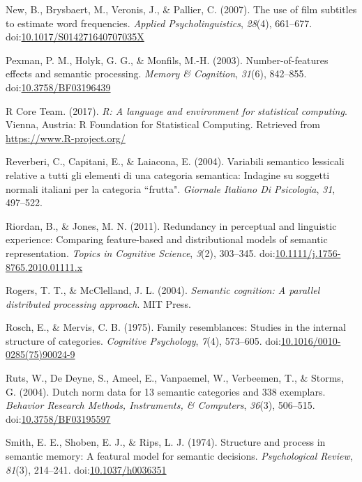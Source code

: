 \documentclass[english,,man]{apa6}
\theoremstyle{definition}
\theoremstyle{definition}
\theoremstyle{definition}
\theoremstyle{remark}
\begin{document}
\leavevmode\hypertarget{ref-New2007}{}%
New, B., Brysbaert, M., Veronis, J., \& Pallier, C. (2007). The use of
film subtitles to estimate word frequencies. \emph{Applied
Psycholinguistics}, \emph{28}(4), 661--677.
doi:\href{https://doi.org/10.1017/S014271640707035X}{10.1017/S014271640707035X}

\leavevmode\hypertarget{ref-Pexman2003}{}%
Pexman, P. M., Holyk, G. G., \& Monfils, M.-H. (2003).
Number-of-features effects and semantic processing. \emph{Memory \&
Cognition}, \emph{31}(6), 842--855.
doi:\href{https://doi.org/10.3758/BF03196439}{10.3758/BF03196439}

\leavevmode\hypertarget{ref-R-base}{}%
R Core Team. (2017). \emph{R: A language and environment for statistical
computing}. Vienna, Austria: R Foundation for Statistical Computing.
Retrieved from \url{https://www.R-project.org/}

\leavevmode\hypertarget{ref-Reverberi2004}{}%
Reverberi, C., Capitani, E., \& Laiacona, E. (2004). Variabili semantico
lessicali relative a tutti gli elementi di una categoria semantica:
Indagine su soggetti normali italiani per la categoria ``frutta".
\emph{Giornale Italiano Di Psicologia}, \emph{31}, 497--522.

\leavevmode\hypertarget{ref-Riordan2011}{}%
Riordan, B., \& Jones, M. N. (2011). Redundancy in perceptual and
linguistic experience: Comparing feature-based and distributional models
of semantic representation. \emph{Topics in Cognitive Science},
\emph{3}(2), 303--345.
doi:\href{https://doi.org/10.1111/j.1756-8765.2010.01111.x}{10.1111/j.1756-8765.2010.01111.x}

\leavevmode\hypertarget{ref-Rogers2004}{}%
Rogers, T. T., \& McClelland, J. L. (2004). \emph{Semantic cognition: A
parallel distributed processing approach}. MIT Press.

\leavevmode\hypertarget{ref-Rosch1975}{}%
Rosch, E., \& Mervis, C. B. (1975). Family resemblances: Studies in the
internal structure of categories. \emph{Cognitive Psychology},
\emph{7}(4), 573--605.
doi:\href{https://doi.org/10.1016/0010-0285(75)90024-9}{10.1016/0010-0285(75)90024-9}

\leavevmode\hypertarget{ref-Ruts2004}{}%
Ruts, W., De Deyne, S., Ameel, E., Vanpaemel, W., Verbeemen, T., \&
Storms, G. (2004). Dutch norm data for 13 semantic categories and 338
exemplars. \emph{Behavior Research Methods, Instruments, \& Computers},
\emph{36}(3), 506--515.
doi:\href{https://doi.org/10.3758/BF03195597}{10.3758/BF03195597}

\leavevmode\hypertarget{ref-Smith1974}{}%
Smith, E. E., Shoben, E. J., \& Rips, L. J. (1974). Structure and
process in semantic memory: A featural model for semantic decisions.
\emph{Psychological Review}, \emph{81}(3), 214--241.
doi:\href{https://doi.org/10.1037/h0036351}{10.1037/h0036351}
\end{document}

